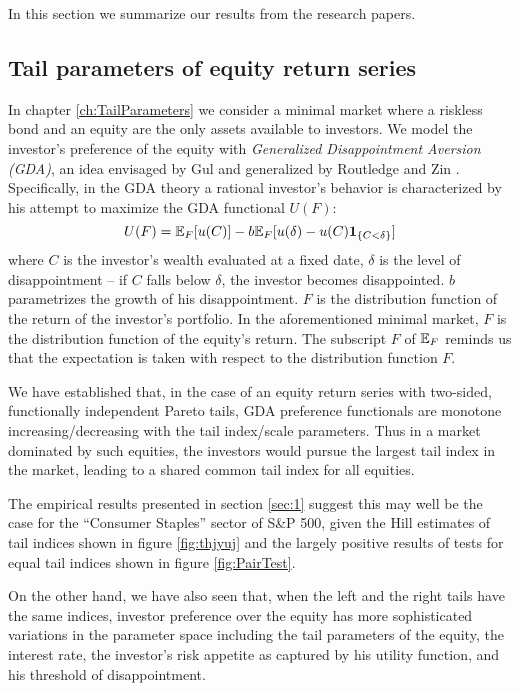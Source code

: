 In this section we summarize our results from the research papers.

\subsection{Tail parameters of equity return series}
In chapter \ref{ch:TailParameters} we consider a
minimal market where a riskless bond and an equity are the only assets
available to investors. We model the investor's preference of the
equity with {\em Generalized Disappointment Aversion (GDA)}, an idea
envisaged by Gul \cite{gul:1991} and generalized by Routledge and Zin
\cite{routledge2010generalized}. Specifically, in the GDA theory a
rational investor's behavior is characterized by his attempt to
maximize the GDA functional $U(F)$:
\[
U(F) = \mathbb{E}_F[u(C)] - b \mathbb{E}_F[u(\delta) - u(C)\mathbf{1}_{\{C < \delta\}}]
\]
where $C$ is the investor's wealth evaluated at a fixed date, $\delta$
is the level of disappointment -- if $C$ falls below $\delta$, the
investor becomes disappointed. $b$ parametrizes the growth of his
disappointment. $F$ is the distribution function of the return of the
investor's portfolio. In the aforementioned minimal market,
$F$ is the distribution function of the equity's return. The subscript
$F$ of $\mathbb{E}_F$ reminds us that the expectation is taken with respect to
the distribution function $F$.

We have established that, in the case of an equity return series with
two-sided, functionally independent Pareto tails, GDA preference
functionals are monotone increasing/decreasing with the
tail index/scale parameters. Thus in a market dominated by such
equities, the investors would pursue the largest tail index in the
market, leading to a shared common tail index for all equities.

The empirical results presented in section \ref{sec:1} suggest this
may well be the case for the ``Consumer Staples'' sector of S\&P 500,
given the Hill estimates of tail indices shown in figure
\ref{fig:thjyuj} and the largely positive results of tests for equal
tail indices shown in figure \ref{fig:PairTest}.

On the other hand, we have also seen that, when the left and the right
tails have the same indices, investor preference over the equity has
more sophisticated variations in the parameter space including the
tail parameters of the equity, the interest rate, the investor's risk
appetite as captured by his utility function, and his threshold of
disappointment.

